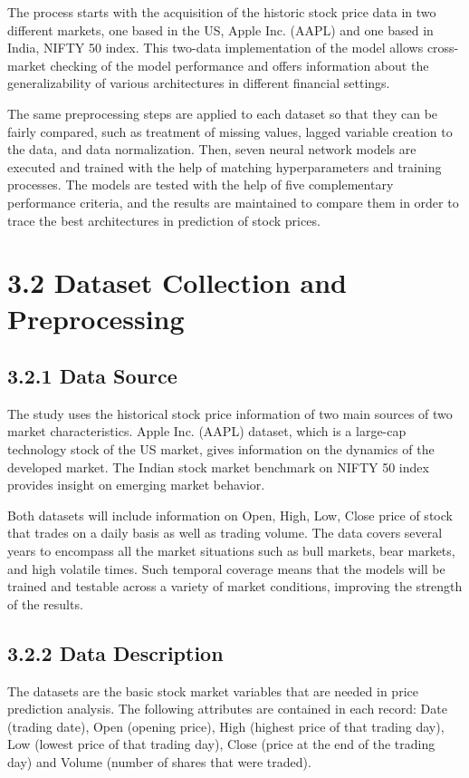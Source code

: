\documentclass[12pt,a4paper]{report}
\begin{document}
The process starts with the acquisition of the historic stock price data in two different markets, one based in the US, Apple Inc. (AAPL) and one based in India, NIFTY 50 index. This two-data implementation of the model allows cross-market checking of the model performance and offers information about the generalizability of various architectures in different financial settings.

The same preprocessing steps are applied to each dataset so that they can be fairly compared, such as treatment of missing values, lagged variable creation to the data, and data normalization. Then, seven neural network models are executed and trained with the help of matching hyperparameters and training processes. The models are tested with the help of five complementary performance criteria, and the results are maintained to compare them in order to trace the best architectures in prediction of stock prices.

\section{3.2 Dataset Collection and Preprocessing}
\subsection{3.2.1 Data Source}
The study uses the historical stock price information of two main sources of two market characteristics. Apple Inc. (AAPL) dataset, which is a large-cap technology stock of the US market, gives information on the dynamics of the developed market. The Indian stock market benchmark on NIFTY 50 index provides insight on emerging market behavior.

Both datasets will include information on Open, High, Low, Close price of stock that trades on a daily basis as well as trading volume. The data covers several years to encompass all the market situations such as bull markets, bear markets, and high volatile times. Such temporal coverage means that the models will be trained and testable across a variety of market conditions, improving the strength of the results.

\subsection{3.2.2 Data Description}
The datasets are the basic stock market variables that are needed in price prediction analysis. The following attributes are contained in each record: Date (trading date), Open (opening price), High (highest price of that trading day), Low (lowest price of that trading day), Close (price at the end of the trading day) and Volume (number of shares that were traded).
\end{document}
